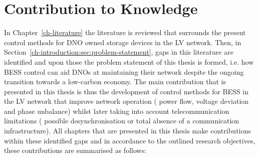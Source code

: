 \section{Contribution to Knowledge}
\label{ch-conclusions:sec:knowledge-contribution}

In Chapter~\ref{ch-literature} the literature is reviewed that surrounds the present control methods for DNO owned storage devices in the LV network.
Then, in Section~\ref{ch-introduction:sec:problem-statement}, gaps in this literature are identified and upon those the problem statement of this thesis is formed, i.e. how BESS control can aid DNOs at maintaining their network despite the ongoing transition towards a low-carbon economy.
The main contribution that is presented in this thesis is thus the development of control methods for BESS in the LV network that improve network operation ( power flow, voltage deviation and phase unbalance) whilst later taking into account telecommunication limitations ( possible desynchronisation or total absence of a communication infrastructure).
All chapters that are presented in this thesis make contributions within these identified gaps and in accordance to the outlined research objectives, these contributions are summarised as follows:

